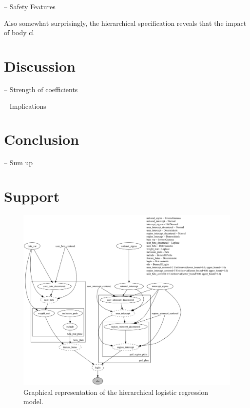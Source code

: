 \documentclass[12pt]{article}
\begin{document}
-- Safety Features


Also somewhat surprisingly, the hierarchical specification
reveals that the impact of body cl


\section{Discussion}

-- Strength of coefficients

-- Implications

\section{Conclusion}

-- Sum up

\section{Support}

\begin{figure}
    \centering
    \includegraphics[width=\textwidth]{images/model_graph.png}
    \caption{Graphical representation of the hierarchical logistic regression model.}
    \label{fig:model_graph}
\end{figure}
\end{document}
